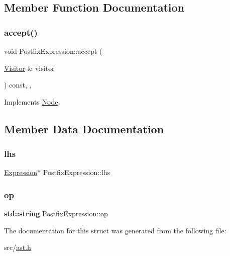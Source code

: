 \subsection{Member Function Documentation}
\mbox{\label{struct_postfix_expression_a2d814c990b7d1fb728f030a2673fe729}} 
\subsubsection{\texorpdfstring{accept()}{accept()}}
{\footnotesize\ttfamily void Postfix\+Expression\+::accept (\begin{DoxyParamCaption}\item[{\hyperlink{struct_visitor}{Visitor} \&}]{visitor }\end{DoxyParamCaption}) const\hspace{0.3cm}{\ttfamily [inline]}, {\ttfamily [override]}, {\ttfamily [virtual]}}



Implements \hyperlink{struct_node_a10bd7af968140bbf5fa461298a969c71}{Node}.



\subsection{Member Data Documentation}
\mbox{\label{struct_postfix_expression_a33a5946e6ded6300ea8552325f22cba9}} 
\subsubsection{\texorpdfstring{lhs}{lhs}}
{\footnotesize\ttfamily \hyperlink{struct_expression}{Expression}$\ast$ Postfix\+Expression\+::lhs}

\mbox{\label{struct_postfix_expression_a9ce1fb591d6787626d2eda8a9ca0a3cd}} 
\subsubsection{\texorpdfstring{op}{op}}
{\footnotesize\ttfamily \textbf{ std\+::string} Postfix\+Expression\+::op}



The documentation for this struct was generated from the following file\+:\begin{DoxyCompactItemize}
\item 
src/\hyperlink{ast_8h}{ast.\+h}\end{DoxyCompactItemize}
